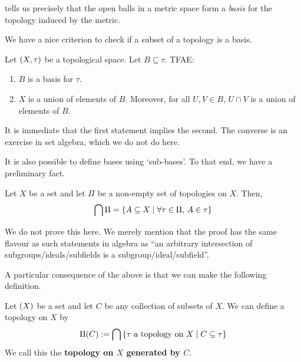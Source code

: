  tells us precisely that the open balls in a metric space form a \textit{basis} for the topology induced by the metric.

We have a nice criterion to check if a subset of a topology is a basis.

\begin{boxproposition}
    Let $\left( X, \tau \right)$ be a topological space. Let $B \subseteq \tau$. TFAE:
    \begin{enumerate}
        \item $B$ is a basis for $\tau$.
        \item $X$ is a union of elements of $B$. Moreover, for all $U, V \in B$, $U \cap V$ is a union of elements of $B$.
    \end{enumerate}
\end{boxproposition}

It is immediate that the first statement implies the second. The converse is an exercise in set algebra, which we do not do here.

It is also possible to define bases using `sub-bases'. To that end, we have a preliminary fact.

\begin{boxlemma}
    Let $X$ be a set and let $\Pi$ be a non-empty set of topologies on $X$. Then,
    \begin{align*}
        \bigcap \Pi = \left\{ A \subseteq X \; \middle\vert \; \forall \tau \in \Pi, \, A \in \tau \right\}
    \end{align*}
\end{boxlemma}

We do not prove this here. We merely mention that the proof has the same flavour as such statements in algebra as ``an arbitrary intersection of subgroups/ideals/subfields is a subgroup/ideal/subfield''.

A particular consequence of the above is that we can make the following definition.

\begin{boxdefinition}
    Let $\left( X \right)$ be a set and let $C$ be any collection of subsets of $X$. We can define a topology on $X$ by
    \begin{align*}
        \Pi(C) := \bigcap \left\{ \tau \text{ a topology on } X \; \middle\vert \; C \subseteq \tau \right\}
    \end{align*}
    We call this the \textbf{topology on $X$ generated by $C$}.
\end{boxdefinition}

